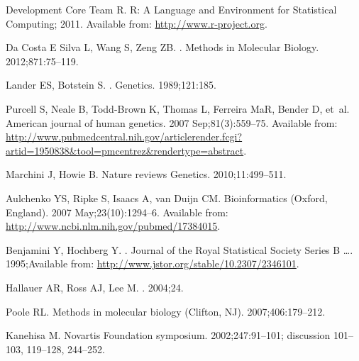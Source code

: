 \documentclass[10pt,letterpaper]{article}
\begin{document}
\begin{thebibliography}{}
{Development Core Team} R. {R: A Language and Environment for Statistical
  Computing}; 2011.
\newblock Available from: \url{http://www.r-project.org}.

{Da Costa E  Silva} L, Wang S, Zeng ZB.
.
\newblock Methods in Molecular Biology. 2012;871:75--119.

Lander ES, Botstein S.
.
\newblock Genetics. 1989;121:185.

Purcell S, Neale B, Todd-Brown K, Thomas L, Ferreira MaR, Bender D, et~al.
\newblock American journal of human genetics. 2007 Sep;81(3):559--75.
\newblock Available from:
  \url{http://www.pubmedcentral.nih.gov/articlerender.fcgi?artid=1950838\&tool=pmcentrez\&rendertype=abstract}.

Marchini J, Howie B.
\newblock Nature reviews Genetics. 2010;11:499--511.

Aulchenko YS, Ripke S, Isaacs A, van Duijn CM.
\newblock Bioinformatics (Oxford, England). 2007 May;23(10):1294--6.
\newblock Available from: \url{http://www.ncbi.nlm.nih.gov/pubmed/17384015}.

Benjamini Y, Hochberg Y.
.
\newblock Journal of the Royal Statistical Society Series B \ldots.
  1995;Available from: \url{http://www.jstor.org/stable/10.2307/2346101}.

Hallauer AR, Ross AJ, Lee M.
. 2004;24.

Poole RL.
\newblock Methods in molecular biology (Clifton, NJ). 2007;406:179--212.

Kanehisa M.
\newblock Novartis Foundation symposium. 2002;247:91--101; discussion 101--103,
  119--128, 244--252.


\end{thebibliography}
\end{document}
